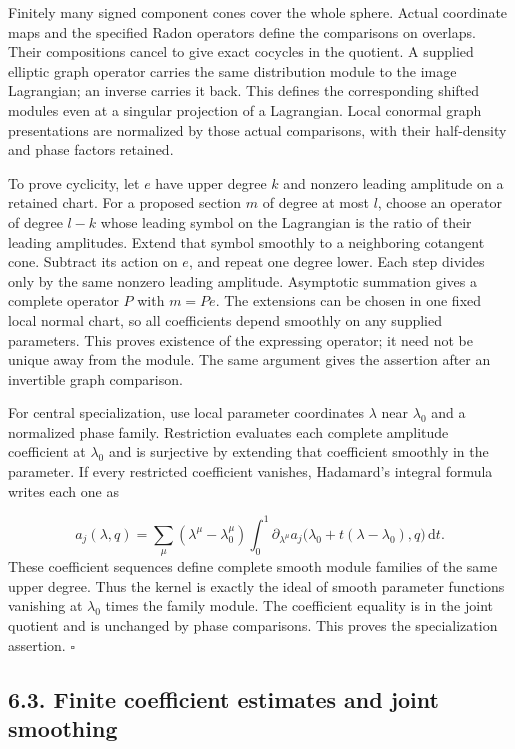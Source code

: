 \documentclass[
  english,
  11pt,
  reqno]{amsart}
\begin{document}
Finitely many signed component cones cover the whole sphere. Actual
coordinate maps and the specified Radon operators define the comparisons
on overlaps. Their compositions cancel to give exact cocycles in the
quotient. A supplied elliptic graph operator carries the same
distribution module to the image Lagrangian; an inverse carries it back.
This defines the corresponding shifted modules even at a singular
projection of a Lagrangian. Local conormal graph presentations are
normalized by those actual comparisons, with their half-density and
phase factors retained.

To prove cyclicity, let \(e\) have upper degree \(k\) and nonzero
leading amplitude on a retained chart. For a proposed section \(m\) of
degree at most \(l\), choose an operator of degree \(l-k\) whose leading
symbol on the Lagrangian is the ratio of their leading amplitudes.
Extend that symbol smoothly to a neighboring cotangent cone. Subtract
its action on \(e\), and repeat one degree lower. Each step divides only
by the same nonzero leading amplitude. Asymptotic summation gives a
complete operator \(P\) with \(m=Pe\). The extensions can be chosen in
one fixed local normal chart, so all coefficients depend smoothly on any
supplied parameters. This proves existence of the expressing operator;
it need not be unique away from the module. The same argument gives the
assertion after an invertible graph comparison.

For central specialization, use local parameter coordinates \(\lambda\)
near \(\lambda_0\) and a normalized phase family. Restriction evaluates
each complete amplitude coefficient at \(\lambda_0\) and is surjective
by extending that coefficient smoothly in the parameter. If every
restricted coefficient vanishes, Hadamard's integral formula writes each
one as

\label{eq:online-module-central-specialization} \[
a_j(\lambda,q)=\sum_\mu(\lambda^\mu-\lambda_0^\mu)
\int_0^1\partial_{\lambda^\mu}a_j
\bigl(\lambda_0+t(\lambda-\lambda_0),q\bigr)\,\mathrm dt.
\] These coefficient sequences define complete smooth module families of
the same upper degree. Thus the kernel is exactly the ideal of smooth
parameter functions vanishing at \(\lambda_0\) times the family module.
The coefficient equality is in the joint quotient and is unchanged by
phase comparisons. This proves the specialization assertion.
\hfill\(\square\)

\subsection{6.3. Finite coefficient estimates and joint
smoothing}\label{finite-coefficient-estimates-and-joint-smoothing}\label{sec:online-finite-calculus-estimates}
\end{document}
